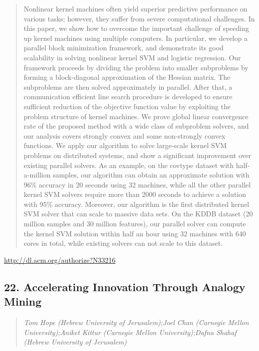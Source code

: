 \documentclass{article}
\begin{document}
\begin{quote}
Nonlinear kernel machines often yield superior predictive performance on various tasks; however, they suffer from severe computational challenges. In this paper, we show how to overcome the important challenge of speeding up kernel machines using multiple computers. In particular, we develop a parallel block minimization framework, and demonstrate its good scalability in solving nonlinear kernel SVM and logistic regression. Our framework proceeds by dividing the problem into smaller subproblems by forming a block-diagonal approximation of the Hessian matrix. The subproblems are then solved approximately in parallel. After that, a communication efficient line search procedure is developed to ensure sufficient reduction of the objective function value by exploiting the problem structure of kernel machines. We prove global linear convergence rate of the proposed method with a wide class of subproblem solvers, and our analysis covers strongly convex and some non-strongly convex functions. We apply our algorithm to solve large-scale kernel SVM problems on distributed systems, and show a significant improvement over existing parallel solvers. As an example, on the covtype dataset with half-a-million samples, our algorithm can obtain an approximate solution with 96\% accuracy in 20 seconds using 32 machines, while all the other parallel kernel SVM solvers require more than 2000 seconds to achieve a solution with 95\% accuracy. Moreover, our algorithm is the first distributed kernel SVM solver that can scale to massive data sets. On the KDDB dataset (20 million samples and 30 million features), our parallel solver can compute the kernel SVM solution within half an hour using 32 machines with 640 cores in total, while existing solvers can not scale to this dataset.
\end{quote}

\href{http://dl.acm.org/authorize?N33216}{http://dl.acm.org/authorize?N33216}

\subsection{22. Accelerating Innovation Through Analogy Mining}

\begin{quote}
\footnotesize{\textit{Tom Hope (Hebrew University of Jerusalem);Joel Chan (Carnegie Mellon University);Aniket Kittur (Carnegie Mellon University);Dafna Shahaf (Hebrew University of Jerusalem)}}

\end{quote}
\end{document}
